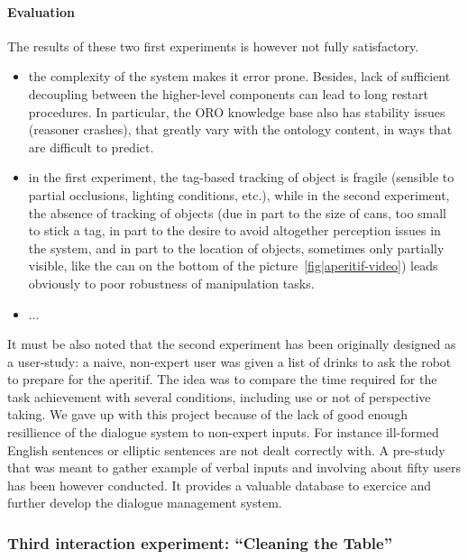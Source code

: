 \paragraph{Evaluation} The results of these two first experiments is however
not fully satisfactory.

\begin{itemize}

    \item the complexity of the system makes it error prone. Besides, lack of
        sufficient decoupling between the higher-level components can lead to
        long restart procedures. In particular, the ORO knowledge base also has
        stability issues (reasoner crashes), that greatly vary with the
        ontology content, in ways that are difficult to predict.

    \item in the first experiment, the tag-based tracking of object is fragile
        (sensible to partial occlusions, lighting conditions, etc.), while in
        the second experiment, the absence of tracking of objects (due in part
        to the size of cans, too small to stick a tag, in part to the desire to
        avoid altogether perception issues in the system, and in part to the
        location of objects, sometimes only partially visible, like the can on
        the bottom of the picture~\ref{fig|aperitif-video}) leads obviously to
        poor robustness of manipulation tasks.

    \item ...
\end{itemize}

It must be also noted that the second experiment has been originally designed
as a user-study: a naive, non-expert user was given a list of drinks to ask the
robot to prepare for the aperitif. The idea was to compare the time required
for the task achievement with several conditions, including use or not of
perspective taking. We gave up with this project because of the lack of good
enough resillience of the dialogue system to non-expert inputs. For instance
ill-formed English sentences or elliptic sentences are not dealt correctly
with. A pre-study that was meant to gather example of verbal inputs and
involving about fifty users has been however conducted. It provides a valuable
database to exercice and further develop the dialogue management system.

\subsubsection{Third interaction experiment: ``Cleaning the Table''}
\label{sect|expe3}

